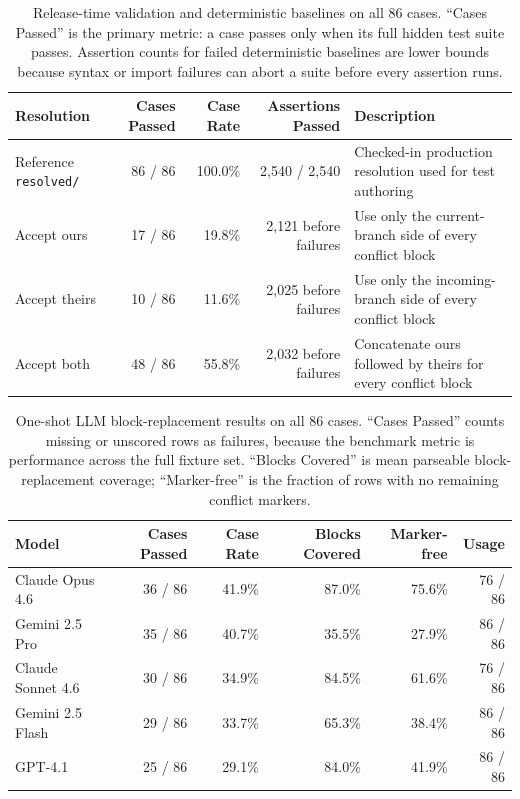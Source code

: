 \documentclass[11pt,letterpaper]{article}
\begin{document}
\begin{table}[ht]
\centering
\caption{Release-time validation and deterministic baselines on all 86 cases. ``Cases Passed'' is the primary metric: a case passes only when its full hidden test suite passes. Assertion counts for failed deterministic baselines are lower bounds because syntax or import failures can abort a suite before every assertion runs.}
\label{tab:release-baselines}
\small
\begin{tabularx}{\textwidth}{lrrrX}
\toprule
\textbf{Resolution} & \textbf{Cases Passed} & \textbf{Case Rate} & \textbf{Assertions Passed} & \textbf{Description} \\
\midrule
Reference \texttt{resolved/} & 86 / 86 & 100.0\% & 2{,}540 / 2{,}540 & Checked-in production resolution used for test authoring \\
Accept ours & 17 / 86 & 19.8\% & 2{,}121 before failures & Use only the current-branch side of every conflict block \\
Accept theirs & 10 / 86 & 11.6\% & 2{,}025 before failures & Use only the incoming-branch side of every conflict block \\
Accept both & 48 / 86 & 55.8\% & 2{,}032 before failures & Concatenate ours followed by theirs for every conflict block \\
\bottomrule
\end{tabularx}
\end{table}

\begin{table}[ht]
\centering
\caption{One-shot LLM block-replacement results on all 86 cases. ``Cases Passed'' counts missing or unscored rows as failures, because the benchmark metric is performance across the full fixture set. ``Blocks Covered'' is mean parseable block-replacement coverage; ``Marker-free'' is the fraction of rows with no remaining conflict markers.}
\label{tab:model-matrix}
\small
\begin{tabular}{lrrrrr}
\toprule
\textbf{Model} & \textbf{Cases Passed} & \textbf{Case Rate} & \textbf{Blocks Covered} & \textbf{Marker-free} & \textbf{Usage} \\
\midrule
Claude Opus 4.6 & 36 / 86 & 41.9\% & 87.0\% & 75.6\% & 76 / 86 \\
Gemini 2.5 Pro & 35 / 86 & 40.7\% & 35.5\% & 27.9\% & 86 / 86 \\
Claude Sonnet 4.6 & 30 / 86 & 34.9\% & 84.5\% & 61.6\% & 76 / 86 \\
Gemini 2.5 Flash & 29 / 86 & 33.7\% & 65.3\% & 38.4\% & 86 / 86 \\
GPT-4.1 & 25 / 86 & 29.1\% & 84.0\% & 41.9\% & 86 / 86 \\
\bottomrule
\end{tabular}
\end{table}
\end{document}
